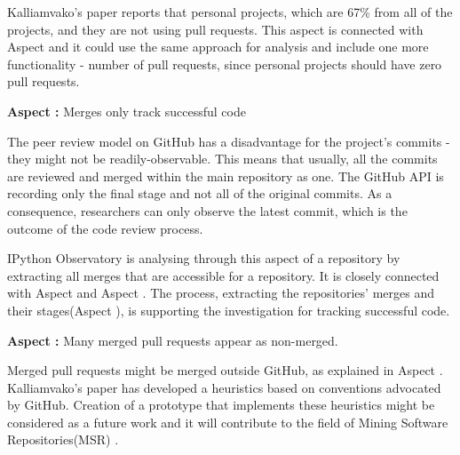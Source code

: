 Kalliamvako's paper\cite{kalliamvakoupromises} reports that personal projects, which are 67\% from all of the projects, and they are not using pull requests. This aspect is connected with Aspect  and it could use the same approach for analysis and include one more functionality - number of pull requests, since personal projects should have zero pull requests.

\vspace{5mm}
\begin{mdframed}
\vspace{1px}
\textbf{Aspect :}  Merges only track successful code
\vspace{1px}
\end{mdframed}
\vspace{2mm}

The peer review model on GitHub has a disadvantage for the project's commits - they might not be readily-observable. This means that usually, all the commits are reviewed and merged within the main repository as one. The GitHub API\cite{gitHubAPI} is recording only the final stage and not all of the original commits. As a consequence, researchers can only observe the latest commit, which is the outcome of the code review process\cite{kalliamvakoupromises}.

IPython Observatory is analysing through this aspect of a repository by extracting all merges that are accessible for a repository. It is closely connected with Aspect  and Aspect . The process, extracting the repositories' merges and their stages(Aspect ), is supporting the investigation for tracking successful code.  

\vspace{5mm}
\begin{mdframed}
\vspace{1px}
\textbf{Aspect :}  Many merged pull requests appear as non-merged.
\vspace{1px}
\end{mdframed}
\vspace{2mm}

Merged pull requests might be merged outside GitHub, as explained in Aspect . Kalliamvako's paper\cite{kalliamvakoupromises} has developed a heuristics based on conventions advocated by GitHub. Creation of a prototype that implements these heuristics might be considered as a future work and it will contribute to the field of Mining Software Repositories(MSR) \cite{MSR2016}.

\vspace{8mm}

